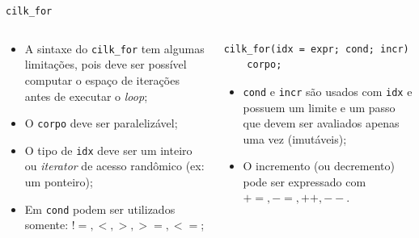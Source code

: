 \documentclass{beamer}
\begin{document}
\begin{frame}[fragile]{\texttt{cilk\_for}}
\begin{columns}[T]
\begin{column}{0.5\textwidth}
\begin{itemize}
    \item A sintaxe do \texttt{cilk\_for} tem algumas limitações, pois deve ser
    possível computar o espaço de iterações antes de executar o \textit{loop};
    \item O \texttt{corpo} deve ser paralelizável;
    \item O tipo de \texttt{idx} deve ser um inteiro ou \textit{iterator} de
    acesso randômico (ex: um ponteiro);
    \item Em \texttt{cond} podem ser utilizados somente: ${ !=, <, >, >=, <= }$;
\end{itemize}
\end{column}

\begin{column}{0.5\textwidth}
\begin{block}{}
\begin{lstlisting}
cilk_for(idx = expr; cond; incr)
    corpo;
\end{lstlisting}
\end{block}
\begin{itemize}
    \item \texttt{cond} e \texttt{incr} são usados com \texttt{idx} e possuem um
    limite e um passo que devem ser avaliados apenas uma vez (imutáveis);
    \item O incremento (ou decremento) pode ser expressado com ${ +=, -=, ++,
    --}$.
\end{itemize}
\end{column}

\end{columns}
\end{frame}
\end{document}
